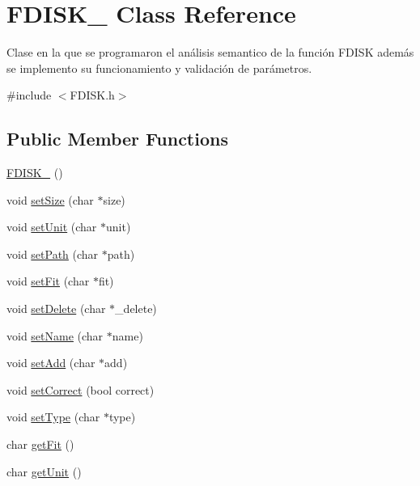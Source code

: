 \hypertarget{classFDISK__}{}\section{F\+D\+I\+S\+K\+\_\+ Class Reference}
\label{classFDISK__}


Clase en la que se programaron el análisis semantico de la función F\+D\+I\+SK además se implemento su funcionamiento y validación de parámetros.  




{\ttfamily \#include $<$F\+D\+I\+S\+K.\+h$>$}

\subsection*{Public Member Functions}
\begin{DoxyCompactItemize}
\item 
\hyperlink{classFDISK___a418b57a089062accc33338bcbb9daec4}{F\+D\+I\+S\+K\+\_\+} ()
\item 
void \hyperlink{classFDISK___ac62891d61885c9e3e5d416b11f067c5b}{set\+Size} (char $\ast$size)
\item 
void \hyperlink{classFDISK___ac829852f41210c96957753e611c96c32}{set\+Unit} (char $\ast$unit)
\item 
void \hyperlink{classFDISK___a7dbf2da61853e0ac59c6ce48862d4013}{set\+Path} (char $\ast$path)
\item 
void \hyperlink{classFDISK___afb2ab7c0bdd1584aa5cb977de810bdd4}{set\+Fit} (char $\ast$fit)
\item 
void \hyperlink{classFDISK___ae5113216c8167ca54b1d5a99d29ed963}{set\+Delete} (char $\ast$\+\_\+delete)
\item 
void \hyperlink{classFDISK___a28bccf6dd576824e040a29b389c8a650}{set\+Name} (char $\ast$name)
\item 
void \hyperlink{classFDISK___a6de35bf474b492d03494d5cdf373df1a}{set\+Add} (char $\ast$add)
\item 
void \hyperlink{classFDISK___a95fb02a0658219e583601de4844a517c}{set\+Correct} (bool correct)
\item 
void \hyperlink{classFDISK___aa45b16384c955ecb2c7f0a02f8e62bb0}{set\+Type} (char $\ast$type)
\item 
char \hyperlink{classFDISK___af29e537ad425951e4c4379f812d18a21}{get\+Fit} ()
\item 
char \hyperlink{classFDISK___abb61ba4d1545287d53bca288bc3ae244}{get\+Unit} ()
\item 

\end{DoxyCompactItemize}
